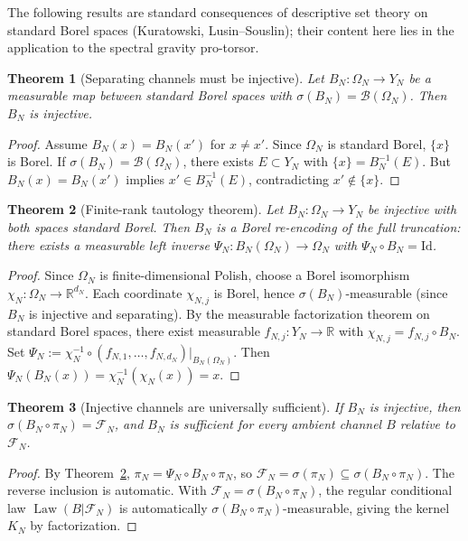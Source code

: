 \documentclass[12pt,a4paper]{article}
\theoremstyle{plain}
\newtheorem{theorem}{Theorem}[section]
\theoremstyle{definition}
\theoremstyle{remark}
\newcommand{\cF}{\mathcal{F}}
\newcommand{\cB}{\mathcal{B}}
\newcommand{\R}{\mathbb{R}}
\newcommand{\Id}{\mathrm{Id}}
\newcommand{\Law}{\operatorname{Law}}
\begin{document}
The following results are standard consequences of descriptive set
theory on standard Borel spaces (Kuratowski, Lusin--Souslin); their
content here lies in the application to the spectral gravity pro-torsor.

\begin{theorem}[Separating channels must be injective]
\label{thm:separating-injective}
Let $B_N\colon \Omega_N \to Y_N$ be a measurable map between standard
Borel spaces with $\sigma(B_N) = \cB(\Omega_N)$.  Then $B_N$ is
injective.
\end{theorem}

\begin{proof}
Assume $B_N(x) = B_N(x')$ for $x \ne x'$.  Since $\Omega_N$ is
standard Borel, $\{x\}$ is Borel.  If $\sigma(B_N) = \cB(\Omega_N)$,
there exists $E \subset Y_N$ with $\{x\} = B_N^{-1}(E)$.  But
$B_N(x) = B_N(x')$ implies $x' \in B_N^{-1}(E)$, contradicting
$x' \notin \{x\}$.
\end{proof}

\begin{theorem}[Finite-rank tautology theorem]
\label{thm:tautology}
Let $B_N\colon \Omega_N \to Y_N$ be injective with both spaces
standard Borel.  Then $B_N$ is a Borel re-encoding of the full
truncation: there exists a measurable left inverse
$\Psi_N\colon B_N(\Omega_N) \to \Omega_N$ with
$\Psi_N \circ B_N = \Id$.
\end{theorem}

\begin{proof}
Since $\Omega_N$ is finite-dimensional Polish, choose a Borel
isomorphism $\chi_N\colon \Omega_N \to \R^{d_N}$.  Each coordinate
$\chi_{N,j}$ is Borel, hence $\sigma(B_N)$-measurable (since
$B_N$ is injective and separating).  By the measurable factorization
theorem on standard Borel spaces, there exist measurable
$f_{N,j}\colon Y_N \to \R$ with $\chi_{N,j} = f_{N,j} \circ B_N$.
Set $\Psi_N := \chi_N^{-1} \circ (f_{N,1},\ldots,f_{N,d_N})|_{B_N(\Omega_N)}$.
Then $\Psi_N(B_N(x)) = \chi_N^{-1}(\chi_N(x)) = x$.
\end{proof}

\begin{theorem}[Injective channels are universally sufficient]
\label{thm:injective-sufficient}
If $B_N$ is injective, then $\sigma(B_N\circ\pi_N) = \cF_N$, and
$B_N$ is sufficient for every ambient channel $B$ relative to $\cF_N$.
\end{theorem}

\begin{proof}
By Theorem~\ref{thm:tautology}, $\pi_N = \Psi_N\circ B_N\circ\pi_N$,
so $\cF_N = \sigma(\pi_N) \subseteq \sigma(B_N\circ\pi_N)$.  The
reverse inclusion is automatic.  With $\cF_N = \sigma(B_N\circ\pi_N)$,
the regular conditional law $\Law(B|\cF_N)$ is automatically
$\sigma(B_N\circ\pi_N)$-measurable, giving the kernel $K_N$ by
factorization.
\end{proof}
\end{document}
